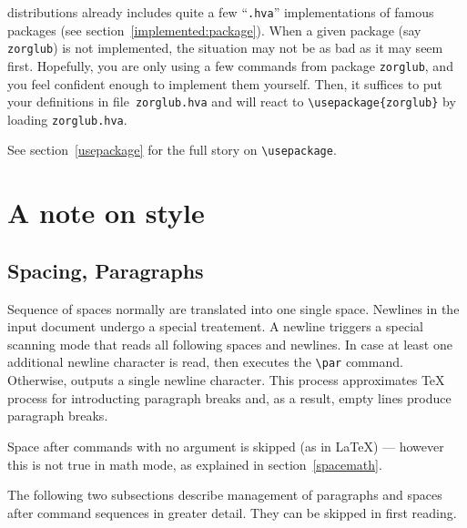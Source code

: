 \hevea{} distributions already includes quite a few ``\texttt{.hva}''
implementations of famous packages (see section~\ref{implemented:package}).
When a given package (say  \texttt{zorglub}) is not implemented, the
situation may not be as bad as it may seem first.
Hopefully, you are only using a few commands from package
\texttt{zorglub}, and you feel confident enough to implement
them yourself.
Then, it suffices to put your definitions in file~\texttt{zorglub.hva}
and \hevea{} will react to \verb+\usepackage{zorglub}+ by loading
\texttt{zorglub.hva}.

See section~\ref{usepackage} for the full story on \verb+\usepackage+.


\section{A note on style}

\subsection{Spacing, Paragraphs}
Sequence of spaces normally are translated into one single space.
Newlines in the input document undergo a special treatement.
A newline triggers a special scanning mode that reads all following
spaces and newlines. In case at least one additional newline character
is read, then \hevea{} executes the \verb+\par+ command.
Otherwise, \hevea{} outputs a single newline character.
This process approximates \TeX{} process for introducting paragraph
breaks and, as a result, empty lines produce paragraph breaks.

Space after commands with no argument is skipped (as in \LaTeX{}) ---
however this is not true in math mode, as explained in
section~\ref{spacemath}.

The following two subsections describe management of paragraphs and
spaces after command sequences in greater detail.
They can be skipped in first reading.

